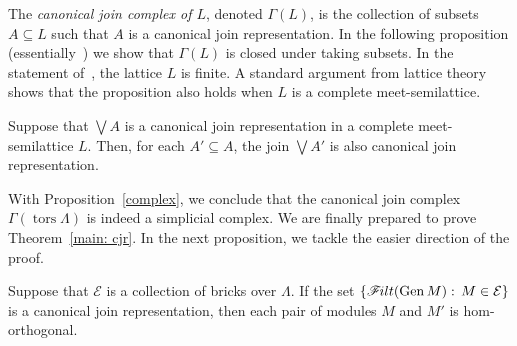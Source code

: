 \documentclass[ALCO,ThmDefs,Unicode,epreuves]{cedram}
\DeclareMathOperator{\tors}{tors}
\newcommand{\calE}{\mathcal{E}}
\newcommand{\filt}{\mathscr{F}\Mk ilt}
\renewcommand{\Join}{\bigvee}
\newcommand{\Meet}{\bigwedge}
\newcommand{\Gen}{\operatorname{Gen}}
\renewcommand{\1}{\hat{1}}
\newcommand{\0}{\hat{0}}
\newcommand{\newword}[1]{\emph{#1}}
\newcommand*{\Mk}{\mkern -2mu}
\begin{document}
The \newword{canonical join complex of $L$}, denoted $\Gamma(L)$, is the collection of subsets $A\subseteq L$ such that $A$ is a canonical join representation.
In the following proposition (essentially~\cite[Proposition~2.2]{arcs}) we show that $\Gamma(L)$ is closed under taking subsets.
In the statement of~\cite[Proposition~2.2]{arcs}, the lattice $L$ is finite.
A standard argument from lattice theory shows that the proposition also holds when $L$ is a complete meet-semilattice.
\begin{proposition}\label{complex}
Suppose that $\Join A$ is a canonical join representation in a complete meet-semilattice $L$.
Then, for each $A'\subseteq A$, the join $\Join A'$ is also canonical join representation.
\end{proposition}
%
With Proposition~\ref{complex}, we conclude that the canonical join complex $\Gamma(\tors \Lambda)$ is indeed a simplicial complex.
We are finally prepared to prove Theorem~\ref{main: cjr}.
In the next proposition, we tackle the easier direction of the proof.
\begin{proposition}\label{cjr only if}
Suppose that $\calE$ is a collection of bricks over $\Lambda$.
If the set $\{\filt(\Gen M):\, M\in \calE\}$ is a canonical join representation, then each pair of modules $M$ and $M'$ is hom-orthogonal.
\end{proposition}
\end{document}
